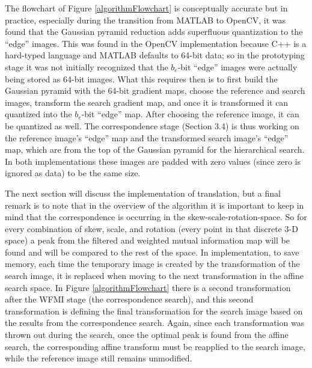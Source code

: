 The flowchart of Figure \ref{algorithmFlowchart} is conceptually accurate but in practice, especially during the transition from MATLAB\textsuperscript{\textregistered} to OpenCV, it was found that the Gaussian pyramid reduction adds superfluous quantization to the ``edge'' images. This was found in the OpenCV implementation because C++ is a hard-typed language and MATLAB\textsuperscript{\textregistered} defaults to 64-bit data; so in the prototyping stage it was not initially recognized that the $b_{e}$-bit ``edge'' images were actually being stored as 64-bit images. What this requires then is to first build the Gaussian pyramid with the 64-bit gradient maps, choose the reference and search images, transform the search gradient map, and once it is transformed it can quantized into the $b_{e}$-bit ``edge'' map. After choosing the reference image, it can be quantized as well. The correspondence stage (Section 3.4) is thus working on the reference image's ``edge'' map and the transformed search image's ``edge'' map, which are from the top of the Gaussian pyramid for the hierarchical search. In both implementations these images are padded with zero values (since zero is ignored as data) to be the same size.

The next section will discuss the implementation of translation, but a final remark is to note that in the overview of the algorithm it is important to keep in mind that the correspondence is occurring in the skew-scale-rotation-space. So for every combination of skew, scale, and rotation (every point in that discrete 3-D space) a peak from the filtered and weighted mutual information map will be found and will be compared to the rest of the space. In implementation, to save memory, each time the temporary image is created by the transformation of the search image, it is replaced when moving to the next transformation in the affine search space. In Figure \ref{algorithmFlowchart} there is a second transformation after the WFMI stage (the correspondence search), and this second transformation is defining the final transformation for the search image based on the results from the correspondence search. Again, since each transformation was thrown out during the search, once the optimal peak is found from the affine search, the corresponding affine transform must be reapplied to the search image, while the reference image still remains unmodified.


